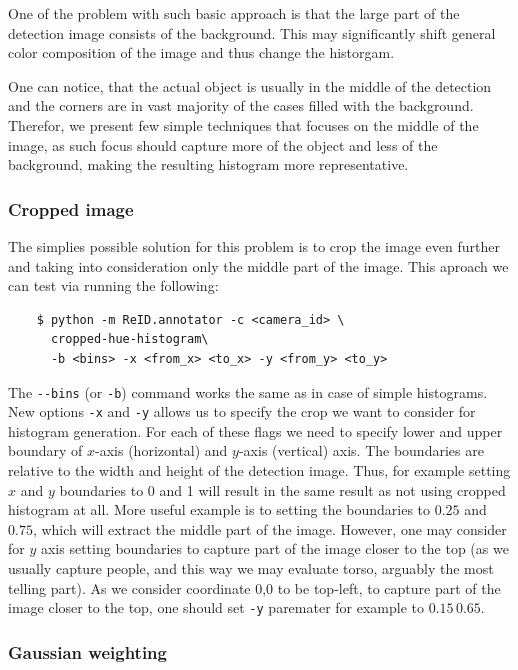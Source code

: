 One of the problem with such basic approach is that the large part of the detection
image consists of the background. This may significantly shift general color composition
of the image and thus change the historgam.

One can notice, that the actual object is usually in the middle of the detection and the
corners are in vast majority of the cases filled with the background. Therefor, we
present few simple techniques that focuses on the middle of the image, as such focus
should capture more of the object and less of the background, making the resulting
histogram more representative.

\subsubsection{Cropped image}

The simplies possible solution for this problem is to crop the image even further 
and taking into consideration only the middle part of the image. This aproach we can
test via running the following:

\begin{verbatim}
    $ python -m ReID.annotator -c <camera_id> \
      cropped-hue-histogram\
      -b <bins> -x <from_x> <to_x> -y <from_y> <to_y>
\end{verbatim}

The \verb+--bins+ (or \verb+-b+) command works the same as in case of simple histograms.
New options \verb+-x+ and \verb+-y+ allows us to specify the crop we want to consider
for histogram generation. For each of these flags we need to specify lower and upper
boundary of $x$-axis (horizontal) and $y$-axis (vertical) axis. The boundaries are
relative to the width and height of the detection image. Thus, for example setting $x$ 
and $y$ boundaries to 0 and 1 will result in the same result as not using cropped
histogram at all. More useful example is to setting the boundaries to $0.25$ and $0.75$,
which will extract the middle part of the image. However, one may consider for $y$ axis
setting boundaries to capture part of the image closer to the top (as we usually
capture people, and this way we may evaluate torso, arguably the most telling part).
As we consider coordinate 0,0 to be top-left, to capture part of the image closer
to the top, one should set \verb+-y+ paremater for example to $0.15\,0.65$.

\subsubsection{Gaussian weighting}

